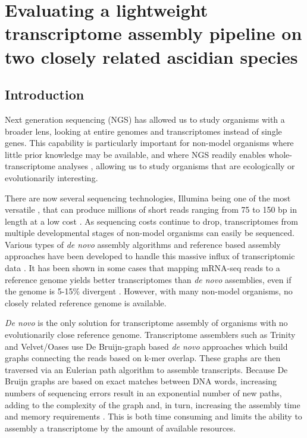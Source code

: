 \chapter{Evaluating a lightweight transcriptome assembly pipeline on two closely related ascidian species}

\section{Introduction}

Next generation sequencing (NGS) has allowed us to study organisms with a broader lens, looking at entire genomes and transcriptomes instead of single genes.  This capability is particularly important for non-model organisms where little prior knowledge may be available, and where NGS readily enables whole-transcriptome analyses \citep{wang_rna-seq:_2009}, allowing us to study organisms that are ecologically or evolutionarily interesting.

There are now several sequencing technologies, Illumina being one of the most versatile \citep{glenn_field_2011}, that can produce millions of short reads ranging from 75 to 150 bp in length at a low cost \citep{zhang_impact_2011}. As sequencing costs continue to drop, transcriptomes from multiple developmental stages of non-model organisms can easily be sequenced. Various types of \textit{de novo} assembly algorithms and reference based assembly approaches have been developed to handle this massive influx of transcriptomic data \citep{pop_genome_2009,vinson_assembly_2005,stapley_adaptation_2010}. It has been shown in some cases that mapping mRNA-seq reads to a reference genome yields better transcriptomes than \textit{de novo} assemblies, even if the genome is 5-15\% divergent \citep{vijay_challenges_2012}. However, with many non-model organisms, no closely related reference genome is available.

\textit{De novo} is the only solution for transcriptome assembly of organisms with no evolutionarily close reference genome.  Transcriptome assemblers such as Trinity \citep{grabherr_full-length_2011} and Velvet/Oases \citep{zerbino_velvet:_2008,schulz_oases:_2012} use De Bruijn-graph based \textit{de novo} approaches which build graphs connecting the reads based on k-mer overlap. These graphs are then traversed via an Eulerian path algorithm to assemble transcripts. Because De Bruijn graphs are based on exact matches between DNA words, increasing numbers of sequencing errors result in an exponential number of new paths, adding to the complexity of the graph and, in turn, increasing the assembly time and memory requirements \citep{pop_genome_2009}. This is both time consuming and limits the ability to assembly a transcriptome by the amount of available resources.

